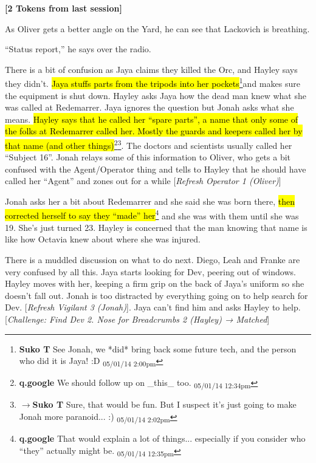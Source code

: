 \textbf{{[}2 Tokens from last session{]}}



As Oliver gets a better angle on the Yard, he can see that Lackovich is breathing.  



``Status report,'' he says over the radio.  



There is a bit of confusion as Jaya claims they killed the Orc, and Hayley says they didn't.  \hl{Jaya stuffs parts from the tripods into her pockets}\footnote{\textbf{Suko T }See Jonah, we *did* bring back some future tech, and the person who did it is Jaya! :D \textsubscript{05/01/14 2:00pm}}and makes sure the equipment is shut down.  Hayley asks Jaya how the dead man knew what she was called at Redemarrer.  Jaya ignores the question but Jonah asks what she means.  \hl{Hayley says that he called her ``spare parts'', a name that only some of the folks at Redemarrer called her.  Mostly the guards and keepers called her by that name (and other things)}\footnote{\textbf{q.google }We should follow up on \_this\_ too. \textsubscript{05/01/14 12:34pm}}\footnote{$\rightarrow$\textbf{Suko T }Sure, that would be fun.  But I suspect it's just going to make Jonah more paranoid... :) \textsubscript{05/01/14 2:02pm}}.  The doctors and scientists usually called her ``Subject 16''.  Jonah relays some of this information to Oliver, who gets a bit confused with the Agent/Operator thing and tells to Hayley that he should have called her ``Agent'' and zones out for a while {[}\textit{Refresh Operator 1 (Oliver)}{]}



Jonah asks her a bit about Redemarrer and she said she was born there, \hl{then corrected herself to say they ``made'' her}\footnote{\textbf{q.google }That would explain a lot of things... especially if you consider who ``they'' actually might be. \textsubscript{05/01/14 12:35pm}} and she was with them until she was 19.  She's just turned 23.   Hayley is concerned that the man knowing that name is like how Octavia knew about where she was injured. 



There is a muddled discussion on what to do next.  Diego, Leah and Franke are very confused by all this.  Jaya starts looking for Dev, peering out of windows.  Hayley moves with her, keeping a firm grip on the back of Jaya's uniform so she doesn't fall out.  Jonah is too distracted by everything going on to help search for Dev. {[}\textit{Refresh Vigilant 3 (Jonah)}{]}.  Jaya can't find him and asks Hayley to help.  {[}\textit{Challenge: Find Dev 2. Nose for Breadcrumbs 2 (Hayley) → Matched}{]}




